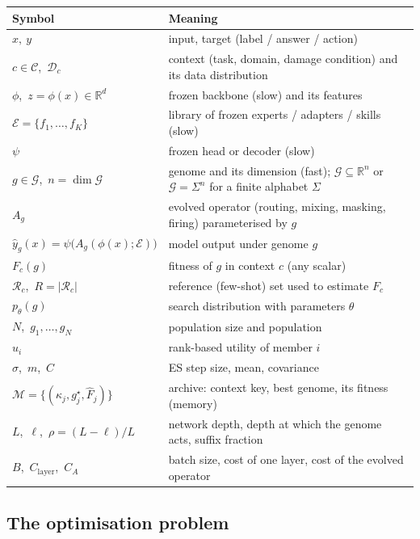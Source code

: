 \documentclass[11pt,a4paper]{article}
\theoremstyle{definition}
\theoremstyle{plain}
\theoremstyle{remark}
\newcommand{\R}{\mathbb{R}}
\newcommand{\Dist}{\mathcal{D}}
\newcommand{\Ctx}{\mathcal{C}}
\newcommand{\Gen}{\mathcal{G}}          %
\newcommand{\Lib}{\mathcal{E}}          %
\newcommand{\Arch}{\mathcal{M}}         %
\newcommand{\RefSet}{\mathcal{R}}          %
\newcommand{\fast}[1]{\textcolor{fast}{#1}}
\newcommand{\slowc}[1]{\textcolor{slow}{#1}}
\newcommand{\memc}[1]{\textcolor{mem}{#1}}
\begin{document}
\begin{center}
\small
\begin{tabularx}{\linewidth}{@{}lX@{}}
\toprule
\textbf{Symbol} & \textbf{Meaning} \\
\midrule
$x,\ y$ & input, target (label / answer / action) \\
$c \in \Ctx$,\ $\Dist_c$ & context (task, domain, damage condition) and its data distribution \\
$\phi$,\ $z=\phi(x)\in\R^{d}$ & frozen backbone (\slowc{slow}) and its features \\
$\Lib = \{f_1,\dots,f_K\}$ & library of frozen experts / adapters / skills (\slowc{slow}) \\
$\psi$ & frozen head or decoder (\slowc{slow}) \\
$g \in \Gen$,\ $n=\dim\Gen$ & genome and its dimension (\fast{fast}); $\Gen \subseteq \R^n$ or $\Gen = \Sigma^n$ for a finite alphabet $\Sigma$ \\
$A_g$ & evolved operator (routing, mixing, masking, firing) parameterised by $g$ \\
$\hat y_g(x) = \psi\big(A_g(\phi(x);\Lib)\big)$ & model output under genome $g$ \\
$F_c(g)$ & fitness of $g$ in context $c$ (any scalar) \\
$\RefSet_c$,\ $R=|\RefSet_c|$ & reference (few-shot) set used to estimate $F_c$ \\
$p_\theta(g)$ & search distribution with parameters $\theta$ \\
$N$,\ $g_1,\dots,g_N$ & population size and population \\
$u_i$ & rank-based utility of member $i$ \\
$\sigma$,\ $m$,\ $C$ & ES step size, mean, covariance \\
$\Arch = \{(\kappa_j, g^\star_j, \hat F_j)\}$ & archive: context key, best genome, its fitness (\memc{memory}) \\
$L$,\ $\ell$,\ $\rho = (L-\ell)/L$ & network depth, depth at which the genome acts, suffix fraction \\
$B$,\ $C_{\text{layer}}$,\ $C_A$ & batch size, cost of one layer, cost of the evolved operator \\
\bottomrule
\end{tabularx}
\end{center}

\subsection{The optimisation problem}
\end{document}
